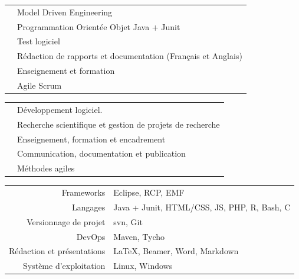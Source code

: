 \tair

\sectionline{}

\tair


\begin{tabular}{r @{~$\rangle$~} p{}}
 & Model Driven Engineering \\
 & Programmation Orientée Objet Java + Junit \\
 & Test logiciel \\
 & Rédaction de rapports et documentation (Français et Anglais) \\
 & Enseignement et formation \\
 & Agile Scrum \\
\end{tabular}

\tair


\begin{tabular}{r @{~$\rangle$~} p{}}
 & Développement logiciel. \\
 & Recherche scientifique et gestion de projets de recherche \\
 & Enseignement, formation et encadrement \\
 & Communication, documentation et publication \\
 & Méthodes agiles \\
\end{tabular}

\tair


\begin{tabular}{r @{~$\rangle$~} p{}}
Frameworks & Eclipse, RCP, EMF\\
Langages & Java + Junit, HTML/CSS, JS, PHP, R, Bash, C \\
Versionnage de projet & svn, Git \\
DevOps & Maven, Tycho \\
Rédaction et présentations & LaTeX, Beamer, Word, Markdown \\
Système d’exploitation & Linux, Windows \\
\end{tabular}





